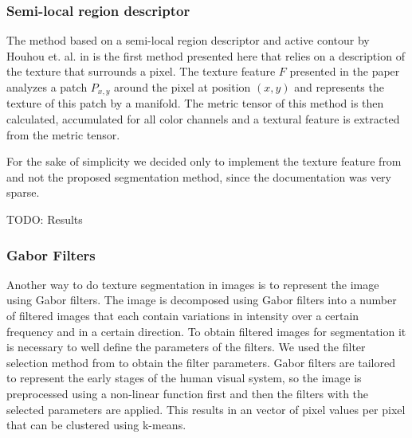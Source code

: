 \documentclass[pdftex,12pt,a4paper]{report}
\begin{document}
\subsubsection{Semi-local region descriptor}

The method based on a semi-local region descriptor and active contour by Houhou et. al. in \cite{houhou2009fast} is the first method presented here that relies on a description of the texture that surrounds a pixel. The texture feature $F$ presented in the paper analyzes a patch $P_{x,y}$ around the pixel at position $(x,y)$ and represents the texture of this patch by a manifold. The metric
tensor of this method is then calculated, accumulated for all color channels and a textural feature is extracted from the metric tensor.

For the sake of simplicity we decided only to implement the texture feature from \cite{houhou2009fast} and not the proposed segmentation method, since the documentation was very sparse.

TODO: Results

\subsubsection{Gabor Filters}

Another way to do texture segmentation in images is to represent the image using Gabor filters. The image is decomposed using Gabor filters into a number of filtered images that each contain variations in intensity over a certain frequency and in a certain direction. To obtain filtered images for segmentation it is necessary to well define the parameters of the filters. We used the filter selection method from \cite{jain1990unsupervised} to obtain the filter parameters. Gabor filters are tailored to represent the early stages of the human visual system, so the image is preprocessed using a non-linear function first and then the filters with the selected parameters are applied. This results in an vector of pixel values per pixel that can be clustered using k-means.
\end{document}
